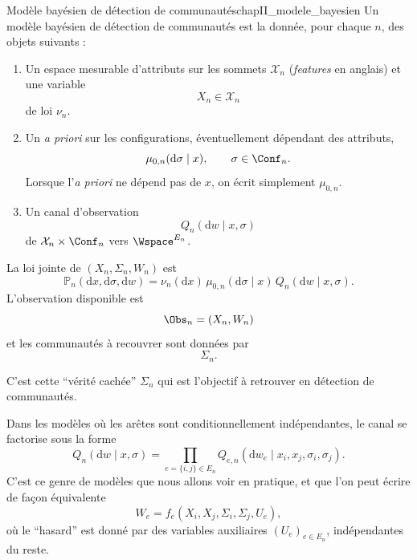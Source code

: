 \begin{Definition}{Modèle bayésien de détection de communautés}{chapII_modele_bayesien}
Un modèle bayésien de détection de communautés est la donnée, pour chaque $n$, des objets suivants :
\begin{enumerate}
    \item Un espace mesurable d'attributs sur les sommets $\mathcal X_n$ (\emph{features} en anglais) et une variable
    \[
        X_n\in\mathcal X_n
    \]
    de loi $\nu_n$.
    \item Un \emph{a priori} sur les configurations, éventuellement dépendant des attributs,
    \[
        \mu_{0,n}(\mathrm d\sigma\mid x),\qquad \sigma\in\Conf_n.
    \]
    Lorsque l'\emph{a priori} ne dépend pas de $x$, on écrit simplement $\mu_{0,n}$.
    \item Un canal d'observation
    \[
        Q_n(\mathrm dw\mid x,\sigma)
    \]
    de $\mathcal X_n\times\Conf_n$ vers $\Wspace^{E_n}$.
\end{enumerate}

La loi jointe de $(X_n,\Sigma_n,W_n)$ est
\begin{equation}
    \mathbb P_n(\mathrm dx,\mathrm d\sigma,\mathrm dw)
    =
    \nu_n(\mathrm dx)\,\mu_{0,n}(\mathrm d\sigma\mid x)\,Q_n(\mathrm dw\mid x,\sigma).
    \label{eq:chapII_loi_jointe_generale}
\end{equation}
L'observation disponible est
\[
    \Obs_n=(X_n,W_n)
\]
et les communautés à recouvrer sont données par 
\[
\Sigma_n .
\]

C'est cette ``vérité cachée'' $\Sigma_n$ qui est l'objectif à retrouver en détection de communautés.
\end{Definition}

Dans les modèles où les arêtes sont conditionnellement indépendantes, le canal se factorise sous la forme
\begin{equation}
    Q_n(\mathrm dw\mid x,
    \sigma)
    =
    \prod_{e=\{i,j\}\in E_n}Q_{e,n}(\mathrm dw_e\mid x_i,x_j,\sigma_i,\sigma_j).
    \label{eq:chapII_canal_produit}
\end{equation}
C'est ce genre de modèles que nous allons voir en pratique, et que l'on peut écrire de façon équivalente
\[
    W_e=f_e(X_i,X_j,\Sigma_i,\Sigma_j,U_e),
\]
où le ``hasard'' est donné par des variables auxiliaires $(U_e)_{e\in E_n}$, indépendantes du reste.

